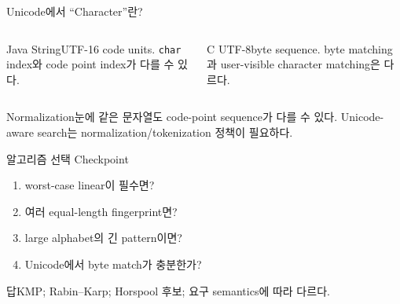 \begin{frame}{Unicode에서 ``Character''란?}
\begin{columns}[T]
\begin{block}{Java String}UTF-16 code units. \texttt{char} index와 code point index가 다를 수 있다.\end{block}
\begin{block}{C UTF-8}byte sequence. byte matching과 user-visible character matching은 다르다.\end{block}
\end{columns}
\begin{alertblock}{Normalization}눈에 같은 문자열도 code-point sequence가 다를 수 있다. Unicode-aware search는 normalization/tokenization 정책이 필요하다.\end{alertblock}
\end{frame}
\begin{frame}{알고리즘 선택 Checkpoint}
\begin{enumerate}\item worst-case linear이 필수면?\item 여러 equal-length fingerprint면?\item large alphabet의 긴 pattern이면?\item Unicode에서 byte match가 충분한가?\end{enumerate}
\begin{exampleblock}{답}KMP; Rabin--Karp; Horspool 후보; 요구 semantics에 따라 다르다.\end{exampleblock}
\end{frame}
